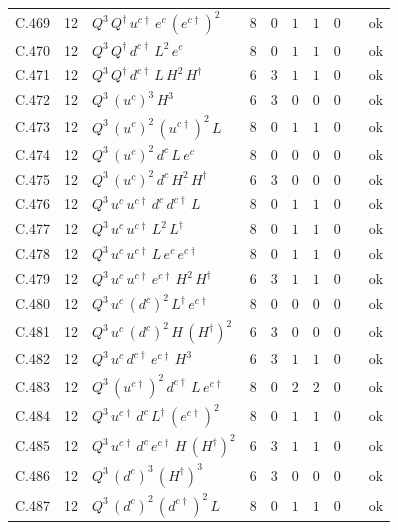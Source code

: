 {\begin{longtable}{@{}ll>{\raggedright\arraybackslash}p{6.4cm}rrllllr@{}}
C.469 & 12 & $Q^{3}\,Q^\dagger\,u^{c\dagger}\,e^c\,(e^{c\dagger})^{2}$ & 8 & 0 & $1$ & $1$ & $0$ &  & ok \\
C.470 & 12 & $Q^{3}\,Q^\dagger\,d^{c\dagger}\,L^{2}\,e^c$ & 8 & 0 & $1$ & $1$ & $0$ &  & ok \\
C.471 & 12 & $Q^{3}\,Q^\dagger\,d^{c\dagger}\,L\,H^{2}\,H^\dagger$ & 6 & 3 & $1$ & $1$ & $0$ &  & ok \\
C.472 & 12 & $Q^{3}\,(u^c)^{3}\,H^{3}$ & 6 & 3 & $0$ & $0$ & $0$ &  & ok \\
C.473 & 12 & $Q^{3}\,(u^c)^{2}\,(u^{c\dagger})^{2}\,L$ & 8 & 0 & $1$ & $1$ & $0$ &  & ok \\
C.474 & 12 & $Q^{3}\,(u^c)^{2}\,d^c\,L\,e^c$ & 8 & 0 & $0$ & $0$ & $0$ &  & ok \\
C.475 & 12 & $Q^{3}\,(u^c)^{2}\,d^c\,H^{2}\,H^\dagger$ & 6 & 3 & $0$ & $0$ & $0$ &  & ok \\
C.476 & 12 & $Q^{3}\,u^c\,u^{c\dagger}\,d^c\,d^{c\dagger}\,L$ & 8 & 0 & $1$ & $1$ & $0$ &  & ok \\
C.477 & 12 & $Q^{3}\,u^c\,u^{c\dagger}\,L^{2}\,L^\dagger$ & 8 & 0 & $1$ & $1$ & $0$ &  & ok \\
C.478 & 12 & $Q^{3}\,u^c\,u^{c\dagger}\,L\,e^c\,e^{c\dagger}$ & 8 & 0 & $1$ & $1$ & $0$ &  & ok \\
C.479 & 12 & $Q^{3}\,u^c\,u^{c\dagger}\,e^{c\dagger}\,H^{2}\,H^\dagger$ & 6 & 3 & $1$ & $1$ & $0$ &  & ok \\
C.480 & 12 & $Q^{3}\,u^c\,(d^c)^{2}\,L^\dagger\,e^{c\dagger}$ & 8 & 0 & $0$ & $0$ & $0$ &  & ok \\
C.481 & 12 & $Q^{3}\,u^c\,(d^c)^{2}\,H\,(H^\dagger)^{2}$ & 6 & 3 & $0$ & $0$ & $0$ &  & ok \\
C.482 & 12 & $Q^{3}\,u^c\,d^{c\dagger}\,e^{c\dagger}\,H^{3}$ & 6 & 3 & $1$ & $1$ & $0$ &  & ok \\
C.483 & 12 & $Q^{3}\,(u^{c\dagger})^{2}\,d^{c\dagger}\,L\,e^{c\dagger}$ & 8 & 0 & $2$ & $2$ & $0$ &  & ok \\
C.484 & 12 & $Q^{3}\,u^{c\dagger}\,d^c\,L^\dagger\,(e^{c\dagger})^{2}$ & 8 & 0 & $1$ & $1$ & $0$ &  & ok \\
C.485 & 12 & $Q^{3}\,u^{c\dagger}\,d^c\,e^{c\dagger}\,H\,(H^\dagger)^{2}$ & 6 & 3 & $1$ & $1$ & $0$ &  & ok \\
C.486 & 12 & $Q^{3}\,(d^c)^{3}\,(H^\dagger)^{3}$ & 6 & 3 & $0$ & $0$ & $0$ &  & ok \\
C.487 & 12 & $Q^{3}\,(d^c)^{2}\,(d^{c\dagger})^{2}\,L$ & 8 & 0 & $1$ & $1$ & $0$ &  & ok \\

\end{longtable}}

